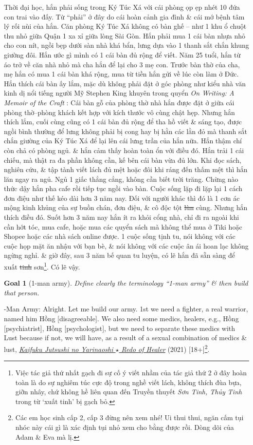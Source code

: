 \documentclass[12pt,twoside]{book}
\newtheorem{goal}{Goal}
\begin{document}
Thời đại học, hắn phải sống trong Ký Túc Xá với cái phòng ọp ẹp nhét 10 đứa con trai vào đấy. Từ ``phải'' ở đây do cái hoàn cảnh gia đình \& cái mớ bệnh tâm lý rối nùi của hắn. Căn phòng Ký Túc Xá không có bàn ghế -- như 1 khu ổ chuột thu nhỏ giữa Quận 1 xa xỉ giữa lòng Sài Gòn. Hắn phải mua 1 cái bàn nhựa nhỏ cho con nít, ngồi bẹp dưới sàn nhà khá bẩn, lưng dựa vào 1 thanh sắt chắn khung giường đôi. Hắn ước gì mình có 1 cái bàn đủ rộng để viết. Năm 25 tuổi, hắn từ {\sc á}o trở về căn nhà nhỏ mà cha hắn để lại cho 3 mẹ con. Trước bàn thờ của cha, mẹ hắn có mua 1 cái bàn khá rộng, mua từ tiền hắn gửi về lúc còn làm ở Đức. Hắn thích cái bàn ấy lắm, mặc dù không phải đặt ở góc phòng như kiểu nhà văn kinh dị nổi tiếng người Mỹ {\sc Stephen King} khuyên trong quyển {\it On Writing: A Memoir of the Craft} \cite{King2000,King2010}: Cái bàn gỗ của phòng thờ nhà hắn được đặt ở giữa cái phòng thờ--phòng khách kết hợp với kích thước vô cùng chật hẹp. Nhưng hắn thích lắm, cuối cùng cũng có 1 cái bàn đủ rộng để tha hồ viết \& sáng tạo, được ngồi bình thường để lưng không phải bị cong hay bị hằn các lằn đỏ mà thanh sắt chắn giường của Ký Túc Xá để lại lên cái lưng trần của hắn nữa. Hắn thậm chí còn chả có phòng ngủ. \& hắn cảm thấy hoàn toàn ổn với điều đó. Hắn trải 1 cái chiếu, mà thật ra đa phần không cần, kế bên cái bàn vừa đủ lớn. Khi đọc sách, nghiên cứu, \& tập tành viết lách đủ mệt hoặc đôi khi ráng đến thấm mệt thì hắn lăn ngay ra ngủ. Ngủ 1 giấc thẳng cẳng, không cần biết trời trăng. Chừng nào thức dậy hắn pha cafe rồi tiếp tục ngồi vào bàn. Cuộc sống lặp đi lặp lại 1 cách đơn điệu như thế kéo dài hơn 3 năm nay. Đối với người khác thì đó là 1 cơn ác mộng kinh khủng của sự  buồn chán, đơn điệu, \& cô độc tột \st{lùn} cùng. Nhưng hắn thích điều đó. Suốt hơn 3 năm nay hắn ít ra khỏi cổng nhà, chỉ đi ra ngoài khi cần hớt tóc, mua cafe, hoặc mua các quyển sách mà không thể mua ở Tiki hoặc Shopee hoặc các nhà sách online được. 1 cuộc sống tịnh tu, nói không với các cuộc họp mặt ăn nhậu với bạn bè, \& nói không với các cuộc ân ái hoan lạc không ngừng nghỉ. \& giờ đây, sau 3 năm bế quan tu luyện, có lẽ hắn đã sẵn sàng để xuất \st{tinh} sơn\footnote{Việc tác giả thứ nhất gạch đi sự cố ý viết nhầm của tác giả thứ 2 ở đây hoàn toàn là do sự nghiêm túc cực độ trong nghề viết lách, không thích đùa bựa, giỡn nhây, chứ không hề liên quan đến Truyền thuyết {\it Sơn Tinh, Thủy Tinh} trong từ `xuất tinh' bị gạch bỏ.}. Có lẽ vậy.

\begin{goal}[1-man army]
	Define clearly the terminology ``1-man army'' \& then build that person.
\end{goal}
{-Man Army}: Alright. Let me build our army. 1st we need a fighter, a real warrior, named him {\sf Hồng [disagreeable]}. We also need some medics, healers, e.g., {\sf Hồng [psychiatrist], Hồng [psychologist]}, but we need to separate these medics with {\sc Lust} because if not, we will have, as a result of a sexual combination of medics \& lust, \href{https://www.imdb.com/title/tt13370404/}{\it Kaifuku Jutsushi no Yarinaoshi $\star$ Redo of Healer} (2021) [18+]\footnote{Các em học sinh cấp 2, cấp 3 đừng nên xem nhé! Ui thui thui, ngăn cấm tụi nhóc này cái gì là xác định tụi nhỏ xem cho bằng được rồi. Dòng dõi của {\sf Adam \& Eva} mà lị.}.
\end{document}
